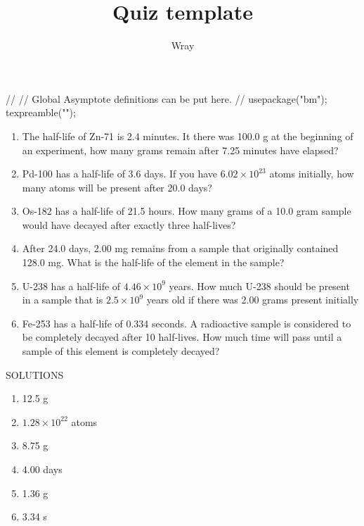 \documentclass[addpoints, 12pt]{exam}
\title{Quiz template}
\author{Wray}
\begin{document}
\begin{asydef}
//
// Global Asymptote definitions can be put here.
//
usepackage("bm");
texpreamble("\def\V#1{\bm{#1}}");
\end{asydef}



\bigskip

             \bigskip
\bigskip


\begin{enumerate}

\item
The half-life of Zn-71 is 2.4 minutes.  It there was 100.0 g at the beginning of an experiment, how many grams remain after 7.25 minutes have elapsed?

\item Pd-100 has a half-life of 3.6 days.  If you have $6.02 \times 10^{23}$ atoms initially, how many atoms will be present after 20.0 days?

\item
Os-182 has a half-life of 21.5 hours.  How many grams of a 10.0 gram sample would have decayed after exactly three half-lives?

\item
After 24.0 days, 2.00 mg remains from a sample that originally contained 128.0 mg.  What is the half-life of the element in the sample?

\item
U-238 has a half-life of $4.46 \times 10^9$ years.  How much U-238 should be present in a sample that is $2.5 \times 10^9$ years old if there was 2.00 grams present initially

\item
Fe-253 has a half-life of 0.334 seconds.  A radioactive sample is considered to be completely decayed after 10 half-lives.  How much time will pass until a sample of this element is completely decayed?

\end{enumerate}

\clearpage

SOLUTIONS

\begin{enumerate}

\item 12.5 g
\item $1.28 \times 10^{22}$ atoms
\item 8.75 g
\item 4.00 days
\item 1.36 g
\item 3.34 s
\end{enumerate}
\end{document}
